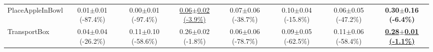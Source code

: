 \begin{table}[htbp]
\begin{adjustbox}{max width=\textwidth}
\begin{tabular}{l*{7}{c}}
PlaceAppleInBowl & 0.01$\pm$0.01 \scriptsize{(-87.4\%)} & 0.00$\pm$0.01 \scriptsize{(-97.4\%)} & \underline{0.06$\pm$0.02 \scriptsize{(-3.9\%)}} & 0.07$\pm$0.06 \scriptsize{(-38.7\%)} & 0.10$\pm$0.04 \scriptsize{(-15.8\%)} & 0.06$\pm$0.05 \scriptsize{(-47.2\%)} & \textbf{0.30$\pm$0.16 \scriptsize{(-6.4\%)}} \\
TransportBox & 0.04$\pm$0.04 \scriptsize{(-26.2\%)} & 0.11$\pm$0.10 \scriptsize{(-58.6\%)} & 0.26$\pm$0.02 \scriptsize{(-1.8\%)} & 0.06$\pm$0.06 \scriptsize{(-78.7\%)} & 0.09$\pm$0.05 \scriptsize{(-62.5\%)} & 0.11$\pm$0.06 \scriptsize{(-58.4\%)} & \textbf{\underline{0.28$\pm$0.01 \scriptsize{(-1.1\%)}}} \\
\bottomrule
\end{tabular}
\end{adjustbox}
\end{table}

